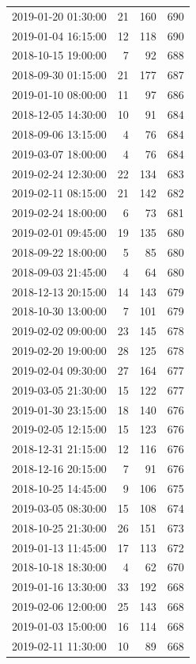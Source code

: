\begin{tabular}{lrrr}
2019-01-20 01:30:00 & 21 & 160 & 690 \\
2019-01-04 16:15:00 & 12 & 118 & 690 \\
2018-10-15 19:00:00 & 7 & 92 & 688 \\
2018-09-30 01:15:00 & 21 & 177 & 687 \\
2019-01-10 08:00:00 & 11 & 97 & 686 \\
2018-12-05 14:30:00 & 10 & 91 & 684 \\
2018-09-06 13:15:00 & 4 & 76 & 684 \\
2019-03-07 18:00:00 & 4 & 76 & 684 \\
2019-02-24 12:30:00 & 22 & 134 & 683 \\
2019-02-11 08:15:00 & 21 & 142 & 682 \\
2019-02-24 18:00:00 & 6 & 73 & 681 \\
2019-02-01 09:45:00 & 19 & 135 & 680 \\
2018-09-22 18:00:00 & 5 & 85 & 680 \\
2018-09-03 21:45:00 & 4 & 64 & 680 \\
2018-12-13 20:15:00 & 14 & 143 & 679 \\
2018-10-30 13:00:00 & 7 & 101 & 679 \\
2019-02-02 09:00:00 & 23 & 145 & 678 \\
2019-02-20 19:00:00 & 28 & 125 & 678 \\
2019-02-04 09:30:00 & 27 & 164 & 677 \\
2019-03-05 21:30:00 & 15 & 122 & 677 \\
2019-01-30 23:15:00 & 18 & 140 & 676 \\
2019-02-05 12:15:00 & 15 & 123 & 676 \\
2018-12-31 21:15:00 & 12 & 116 & 676 \\
2018-12-16 20:15:00 & 7 & 91 & 676 \\
2018-10-25 14:45:00 & 9 & 106 & 675 \\
2019-03-05 08:30:00 & 15 & 108 & 674 \\
2018-10-25 21:30:00 & 26 & 151 & 673 \\
2019-01-13 11:45:00 & 17 & 113 & 672 \\
2018-10-18 18:30:00 & 4 & 62 & 670 \\
2019-01-16 13:30:00 & 33 & 192 & 668 \\
2019-02-06 12:00:00 & 25 & 143 & 668 \\
2019-01-03 15:00:00 & 16 & 114 & 668 \\
2019-02-11 11:30:00 & 10 & 89 & 668 \\

\end{tabular}
